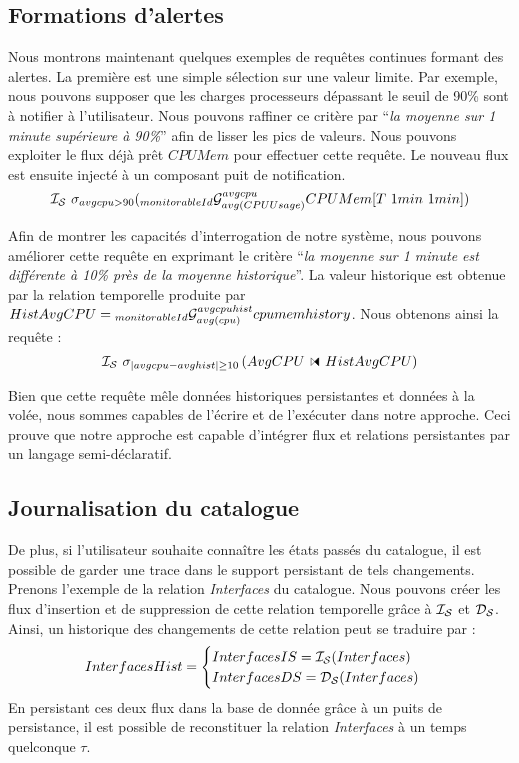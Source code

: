 \subsection{Formations d'alertes}\label{sec:valid:domvision:requetes:alerte}
Nous montrons maintenant quelques exemples de requêtes continues formant des alertes. La première est une simple sélection sur une valeur limite. Par exemple, nous pouvons supposer que les charges processeurs dépassant le seuil de 90\% sont à notifier à l'utilisateur. Nous pouvons raffiner ce critère par \enquote{\it la moyenne sur 1 minute supérieure à 90\%} afin de lisser les pics de valeurs. Nous pouvons exploiter le flux déjà prêt $CPUMem$ pour effectuer cette requête. Le nouveau flux est ensuite injecté à un composant puit de notification.
$$\IS\ \sigma_{avgcpu>90}(\null_{monitorableId}\G_{avg(CPUUsage)}^{avgcpu} CPUMem[T\ 1min\ 1min])$$

Afin de montrer les capacités d'interrogation de notre système, nous pouvons améliorer cette requête en exprimant le critère \enquote{\it la moyenne sur 1 minute est différente à 10\% près de la moyenne historique}. La valeur historique est obtenue par la relation temporelle produite par $HistAvgCPU=\null_{monitorableId}\G_{avg(cpu)}^{avgcpuhist} cpumemhistory$. Nous obtenons ainsi la requête :
$$\IS\ \sigma_{\abs{avgcpu-avghist}\geq 10}\left(AvgCPU\ssjoin HistAvgCPU\right)$$

Bien que cette requête mêle données historiques persistantes et données à la volée, nous sommes capables de l'écrire et de l'exécuter dans notre approche. Ceci prouve que notre approche est capable d'intégrer flux et relations persistantes par un langage semi-déclaratif.

\subsection{Journalisation du catalogue}
De plus, si l'utilisateur souhaite connaître les états passés du catalogue, il est possible de garder une trace dans le support persistant de tels changements. Prenons l'exemple de la relation \textit{Interfaces} du catalogue. Nous pouvons créer les flux d'insertion et de suppression de cette relation temporelle grâce à $\mathcal{I_S}$ et $\mathcal{D_S}$. Ainsi, un historique des changements de cette relation peut se traduire par :
$$InterfacesHist = \begin{cases} InterfacesIS = \mathcal{I_S}(Interfaces) \\ InterfacesDS = \mathcal{D_S}(Interfaces)\end{cases}$$
En persistant ces deux flux dans la base de donnée grâce à un puits de persistance, il est possible de reconstituer la relation \textit{Interfaces} à un temps quelconque $\tau$.

